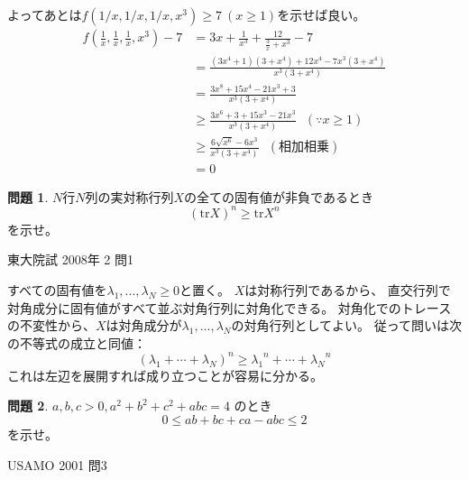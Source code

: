 \documentclass[uplatex, a5paper]{jsarticle}
\makeatletter
\theoremstyle{definition}
\newtheorem{prob}{問題}
\renewenvironment{proof}[1][\proofname]{
  \pushQED{\qed}%
  \normalfont \topsep6\p@\@plus6\p@\relax
  \trivlist
  \item[\hskip\labelsep
    #1\@addpunct{\textbf{.}}]\ignorespaces
}{%
  \popQED\endtrivlist\@endpefalse
}
\providecommand{\proofname}{証明}
\def\qed{\hfill $\Box$}
\makeatother
\begin{document}
\begin{proof}
  よってあとは\(f(1/x,1/x,1/x,x^3) \geq 7 \ (x \geq 1)\)を示せば良い。
  \begin{align*}
    f(\frac{1}{x},\frac{1}{x},\frac{1}{x},x^3) -7
    &= 3x + \frac{1}{x^3} + \frac{12}{\frac{3}{x} + x^3} - 7 \\
    &= \frac{(3x^4 + 1)(3+x^4) + 12x^4 - 7x^3(3+x^4)}{x^3(3 + x^4)} \\
    &= \frac{3x^8 + 15x^4 - 21x^3 + 3 }{x^3(3 + x^4)} \\
    &\geq \frac{3x^6 +3 + 15x^3 - 21x^3 }{x^3(3 + x^4)} \ \ \ ( \because x \geq 1 )\\
    &\geq \frac{6\sqrt{x^6} - 6x^3}{x^3(3 + x^4)} \ \ \ ( \mbox{相加相乗} ) \\
    &= 0
  \end{align*}
\end{proof}








\newpage

\begin{prob}
  \(N\)行\(N\)列の実対称行列\(X\)の全ての固有値が非負であるとき
  \[
  \left( \mathrm{tr} X \right) ^n \geq \mathrm{tr} X^n
  \]
  を示せ。
  \begin{flushright}
    東大院試 2008年 2 問1
  \end{flushright}
\end{prob}


\begin{proof}
  すべての固有値を\(\lambda _1 , ... , \lambda _N \geq 0\)と置く。
  \(X\)は対称行列であるから、
  直交行列で対角成分に固有値がすべて並ぶ対角行列に対角化できる。
  対角化でのトレースの不変性から、\(X\)は対角成分が\(\lambda _1 , ... , \lambda _N\)の対角行列としてよい。
  従って問いは次の不等式の成立と同値：
  \[
  \left( \lambda _1 + \cdots + \lambda _N \right) ^n \geq {\lambda _1}^n + \cdots + { \lambda _N }^n
  \]
  これは左辺を展開すれば成り立つことが容易に分かる。
\end{proof}










\newpage

\begin{prob}
  \(a,b,c>0,a^2+b^2+c^2+abc=4\)
  のとき
  \[
  0 \leq ab+bc+ca-abc \leq 2
  \]
  を示せ。
  \begin{flushright}
    USAMO 2001 問3
  \end{flushright}
\end{prob}
\end{document}
